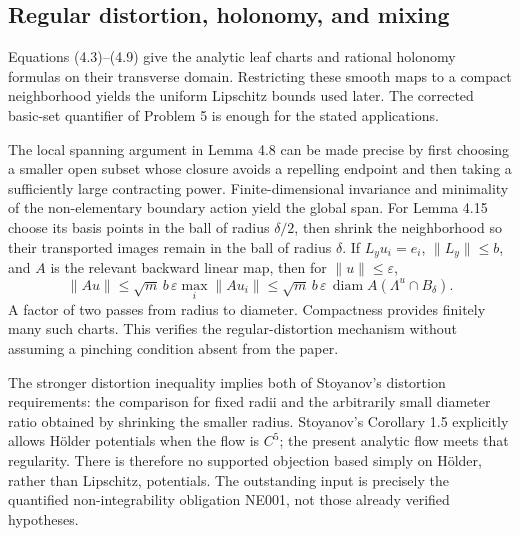 \documentclass[10pt]{article}
\begin{document}
\subsection*{Regular distortion, holonomy, and mixing}
Equations (4.3)–(4.9) give the analytic leaf charts and rational holonomy formulas on their transverse domain. Restricting these smooth maps to a compact neighborhood yields the uniform Lipschitz bounds used later. The corrected basic-set quantifier of Problem 5 is enough for the stated applications.\par
The local spanning argument in Lemma 4.8 can be made precise by first choosing a smaller open subset whose closure avoids a repelling endpoint and then taking a sufficiently large contracting power. Finite-dimensional invariance and minimality of the non-elementary boundary action yield the global span. For Lemma 4.15 choose its basis points in the ball of radius \(\delta/2\), then shrink the neighborhood so their transported images remain in the ball of radius \(\delta\). If \(L_yu_i=e_i\), \(\|L_y\|\leq b\), and \(A\) is the relevant backward linear map, then for \(\|u\|\leq\varepsilon\), \[\|Au\|
 \leq\sqrt m\,b\,\varepsilon\max_i\|Au_i\|
 \leq\sqrt m\,b\,\varepsilon\,
       \operatorname{diam}A(\Lambda^u\cap B_\delta).\] A factor of two passes from radius to diameter. Compactness provides finitely many such charts. This verifies the regular-distortion mechanism without assuming a pinching condition absent from the paper.\par
The stronger distortion inequality implies both of Stoyanov’s distortion requirements: the comparison for fixed radii and the arbitrarily small diameter ratio obtained by shrinking the smaller radius. Stoyanov’s Corollary 1.5 explicitly allows Hölder potentials when the flow is \(C^5\); the present analytic flow meets that regularity. There is therefore no supported objection based simply on Hölder, rather than Lipschitz, potentials. The outstanding input is precisely the quantified non-integrability obligation NE001, not those already verified hypotheses.\par
\end{document}
